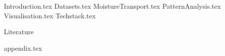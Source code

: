 \documentclass[aspectratio=169]{beamer}
\begin{document}
\maketitlepage %

{Introduction.tex}
{Datasets.tex}
{MoistureTransport.tex}
{PatternAnalysis.tex}
{Visualisation.tex}
{Techstack.tex}
\begin{frame}[allowframebreaks]{Literature}
\printbibliography
\end{frame}
{appendix.tex}
\end{document}
